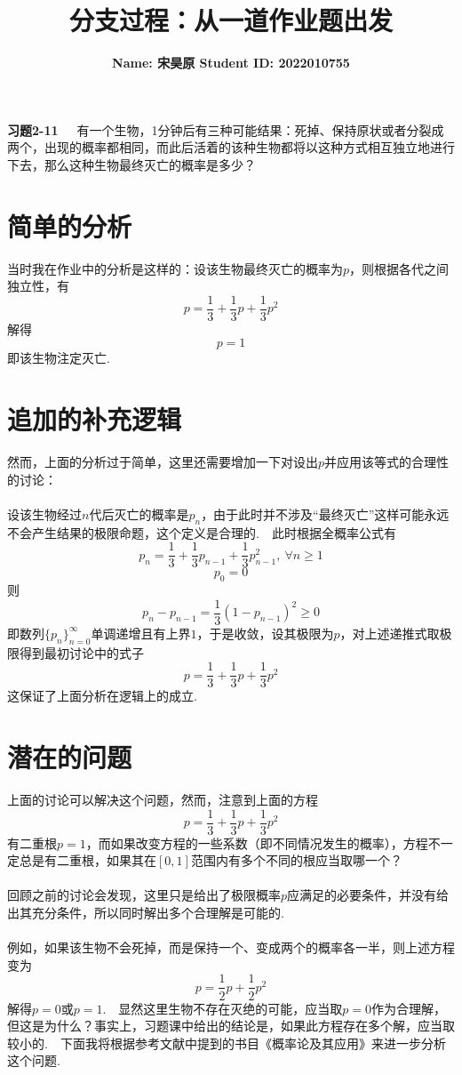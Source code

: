 \documentclass{article}
\title{\bf\Large  分支过程：从一道作业题出发}
\author{\bf Name: 宋昊原 \qquad Student ID: 2022010755}
\begin{document}
\begin{CJK}{UTF8}{gbsn}
\maketitle
\textbf{习题2-11}\ \ \  有一个生物，1分钟后有三种可能结果：死掉、保持原状或者分裂成两个，出现的概率都相同，而此后活着的该种生物都将以这种方式相互独立地进行下去，那么这种生物最终灭亡的概率是多少？
\section{简单的分析}
当时我在作业中的分析是这样的：设该生物最终灭亡的概率为$p$，则根据各代之间独立性，有
$$ p = \frac{1}{3}+\frac{1}{3}p+\frac{1}{3}p^{2} $$
解得
$$ p=1 $$
即该生物注定灭亡.
\section{追加的补充逻辑}
然而，上面的分析过于简单，这里还需要增加一下对设出$p$并应用该等式的合理性的讨论：
\\\\
设该生物经过$n$代后灭亡的概率是$p_{n}$，由于此时并不涉及“最终灭亡”这样可能永远不会产生结果的极限命题，这个定义是合理的.\ \ 此时根据全概率公式有
$$ p_{n} = \frac{1}{3}+\frac{1}{3}p_{n-1}+\frac{1}{3}p_{n-1}^{2},\ \forall n\geq 1 $$
$$ p_{0} = 0 $$
则
$$ p_{n}-p_{n-1}=\frac{1}{3}(1-p_{n-1})^{2}\geq 0 $$
即数列$\{p_{n}\}_{n=0}^{\infty}$单调递增且有上界$1$，于是收敛，设其极限为$p$，对上述递推式取极限得到最初讨论中的式子
$$ p = \frac{1}{3}+\frac{1}{3}p+\frac{1}{3}p^{2} $$
这保证了上面分析在逻辑上的成立.
\section{潜在的问题}
上面的讨论可以解决这个问题，然而，注意到上面的方程
$$ p = \frac{1}{3}+\frac{1}{3}p+\frac{1}{3}p^{2} $$
有二重根$p=1$，而如果改变方程的一些系数（即不同情况发生的概率），方程不一定总是有二重根，如果其在$[0,1]$范围内有多个不同的根应当取哪一个？
\\\\
回顾之前的讨论会发现，这里只是给出了极限概率$p$应满足的必要条件，并没有给出其充分条件，所以同时解出多个合理解是可能的.
\\\\
例如，如果该生物不会死掉，而是保持一个、变成两个的概率各一半，则上述方程变为
$$ p=\frac{1}{2}p+\frac{1}{2}p^{2} $$
解得$p=0$或$p=1$.\ \ 显然这里生物不存在灭绝的可能，应当取$p=0$作为合理解，但这是为什么？事实上，习题课中给出的结论是，如果此方程存在多个解，应当取较小的.\ \ 下面我将根据参考文献中提到的书目《概率论及其应用》来进一步分析这个问题.

\end{CJK}
\end{document}
